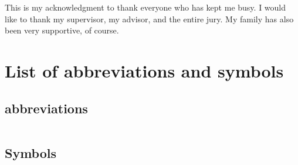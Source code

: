 \documentclass[master=ewtk,masteroption=ec]{kulemt}
\begin{document}
\begin{preface}
This is my acknowledgment to thank everyone who has kept me busy.
I would like to thank my supervisor, my advisor, and the entire jury.
My family has also been very supportive, of course.
\end{preface}

\tableofcontents*

\begin{abstract}
  
\end{abstract}

\listoffiguresandtables
\chapter{List of abbreviations and symbols}
\section*{abbreviations}
\begin{flushleft}
  \renewcommand{\arraystretch}{1.1}
  \begin{tabularx}{\textwidth}{@{}p{12mm}X@{}}


  \end{tabularx}
\end{flushleft}
\section*{Symbols}
\begin{flushleft}
  \renewcommand{\arraystretch}{1.1}
  \begin{tabularx}{\textwidth}{@{}p{12mm}X@{}}


  \end{tabularx}
\end{flushleft}

\mainmatter










\appendixpage*          %
\appendix


\backmatter



\end{document}

